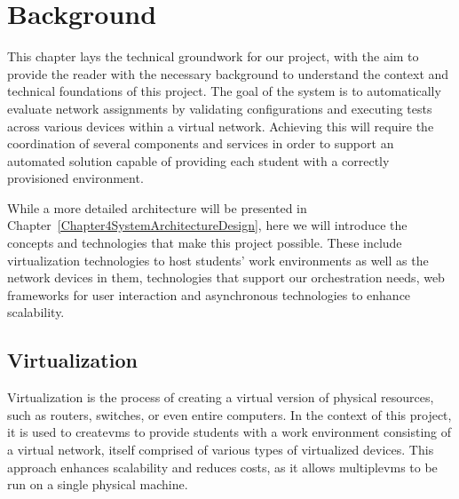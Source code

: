 
\chapter{Background}


\label{Chapter2Background}


This chapter lays the technical groundwork for our project, with the aim to provide the reader with the necessary background to 
understand the context and technical foundations of this project. The goal of the system is to automatically evaluate network 
assignments by validating configurations and executing tests across various devices within a virtual network. Achieving this 
will require the coordination of several components and services in order to support an automated solution capable of providing 
each student with a correctly provisioned environment. 

While a more detailed architecture will be presented in Chapter~\ref{Chapter4SystemArchitectureDesign}, here we will introduce the 
concepts and technologies that make this project possible. These include virtualization technologies to host students' work environments 
as well as the network devices in them, technologies that support our orchestration needs, web frameworks for user interaction and asynchronous 
technologies to enhance scalability.

\section{Virtualization}
  Virtualization is the process of creating a virtual version of physical resources, such as routers, switches, or even
  entire computers. In the context of this project, it is used to create\ac{vm}s to provide students with a 
  work environment consisting of a virtual network, itself comprised of various types of virtualized devices. This approach 
  enhances scalability and reduces costs, as it allows multiple\ac{vm}s to be run on a single physical machine.

